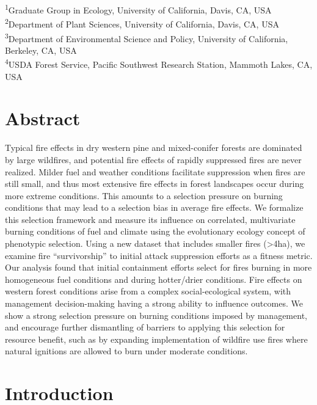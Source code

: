 \documentclass[twoside,12pt,final]{ucthesis-CA2012}
\begin{document}
\begin{ucmainmatter}
\textsuperscript{1}Graduate Group in Ecology, University of California,
Davis, CA, USA\\
\textsuperscript{2}Department of Plant Sciences, University of
California, Davis, CA, USA\\
\textsuperscript{3}Department of Environmental Science and Policy,
University of California, Berkeley, CA, USA\\
\textsuperscript{4}USDA Forest Service, Pacific Southwest Research
Station, Mammoth Lakes, CA, USA

\section{Abstract}\label{abstract-2}

Typical fire effects in dry western pine and mixed-conifer forests are
dominated by large wildfires, and potential fire effects of rapidly
suppressed fires are never realized. Milder fuel and weather conditions
facilitate suppression when fires are still small, and thus most
extensive fire effects in forest landscapes occur during more extreme
conditions. This amounts to a selection pressure on burning conditions
that may lead to a selection bias in average fire effects. We formalize
this selection framework and measure its influence on correlated,
multivariate burning conditions of fuel and climate using the
evolutionary ecology concept of phenotypic selection. Using a new
dataset that includes smaller fires (\textgreater{}4ha), we examine fire
``survivorship'' to initial attack suppression efforts as a fitness
metric. Our analysis found that initial containment efforts select for
fires burning in more homogeneous fuel conditions and during
hotter/drier conditions. Fire effects on western forest conditions arise
from a complex social-ecological system, with management decision-making
having a strong ability to influence outcomes. We show a strong
selection pressure on burning conditions imposed by management, and
encourage further dismantling of barriers to applying this selection for
resource benefit, such as by expanding implementation of wildfire use
fires where natural ignitions are allowed to burn under moderate
conditions.

\section{Introduction}\label{introduction-2}


\end{ucmainmatter}
\end{document}
